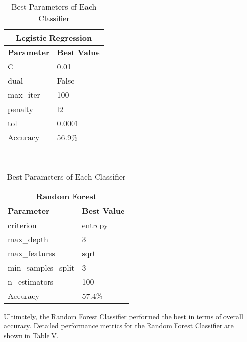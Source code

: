 \documentclass[letterpaper, 10 pt, conference]{ieeeconf}
\begin{document}
\begin{table}[h]
\caption{Best Parameters of Each Classifier}
\centering
\begin{tabular}{@{}ll@{}}
\multicolumn{2}{c}{\textbf{Logistic Regression}} \\ \toprule
\textbf{Parameter}     & \textbf{Best Value}     \\ \midrule
C                      & 0.01                    \\
dual                   & False                   \\
max\_iter              & 100                     \\
penalty                & l2                      \\
tol                    & 0.0001                  \\\midrule
Accuracy & 56.9\% \\\bottomrule
\end{tabular}\\\medskip
\begin{tabular}{@{}ll@{}}

\multicolumn{2}{c}{\textbf{Random Forest}}                                       \\ \toprule
\textbf{Parameter} & \textbf{Best Value} \\\midrule
criterion                              & entropy                                 \\
max\_depth                             & 3                                       \\
max\_features                          & sqrt                                    \\
min\_samples\_split                    & 3                                       \\
n\_estimators                          & 100                                     \\ \midrule
Accuracy & 57.4\% \\\bottomrule
\end{tabular}
\end{table}

Ultimately, the Random Forest Classifier performed the best in terms of overall accuracy.  Detailed performance metrics for the Random Forest Classifier are shown in Table V.
\end{document}
